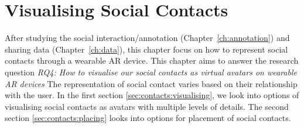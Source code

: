 \chapter{Visualising Social Contacts}
\label{ch:contacts} 

After studying the social interaction/annotation (Chapter~\ref{ch:annotation}) and sharing data (Chapter~\ref{ch:data}), this chapter focus on how to represent social contacts through a wearable AR device. 
This chapter aims to answer the research question \textit{RQ4: How to visualise our social contacts as virtual avatars on wearable AR devices}
The representation of social contact varies based on their relationship with the user. 
In the first section \ref{sec:contacts:visualising}, we look into options of visualising social contacts as avatars with multiple levels of details. The second section \ref{sec:contacts:placing} looks into options for placement of social contacts. 




